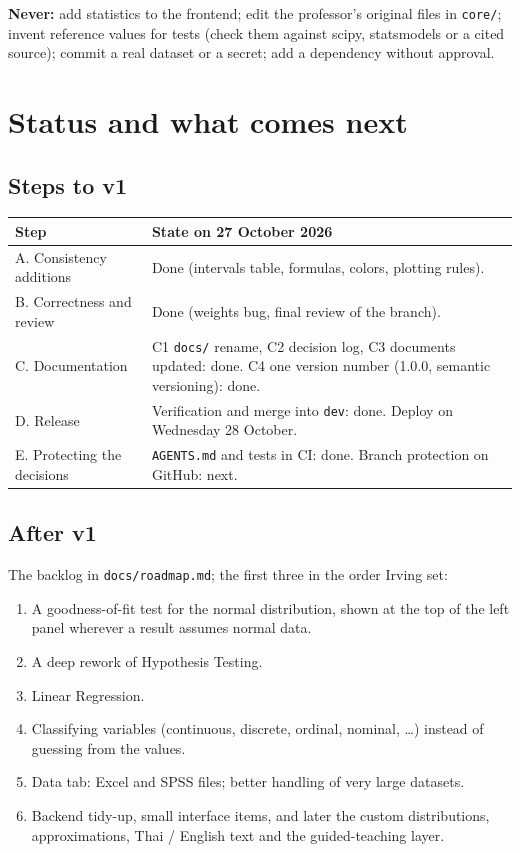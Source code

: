 \documentclass[11pt,a4paper]{article}
\newcommand{\f}[1]{\texttt{#1}}
\begin{document}
\begin{note}
\textbf{Never:} add statistics to the frontend; edit the professor's original files in \f{core/}; invent
reference values for tests (check them against scipy, statsmodels or a cited source); commit a real dataset or
a secret; add a dependency without approval.
\end{note}

\section{Status and what comes next}

\subsection{Steps to v1}
\begin{tabularx}{\textwidth}{@{}lL@{}}
\toprule
\textbf{Step} & \textbf{State on 27 October 2026} \\
\midrule
A. Consistency additions & Done (intervals table, formulas, colors, plotting rules). \\
B. Correctness and review & Done (weights bug, final review of the branch). \\
C. Documentation & C1 \f{docs/} rename, C2 decision log, C3 documents updated: done. C4 one version number (1.0.0, semantic versioning): done. \\
D. Release & Verification and merge into \f{dev}: done. Deploy on Wednesday 28 October. \\
E. Protecting the decisions & \f{AGENTS.md} and tests in CI: done. Branch protection on GitHub: next. \\
\bottomrule
\end{tabularx}

\subsection{After v1}
The backlog in \f{docs/roadmap.md}; the first three in the order Irving set:
\begin{enumerate}
\item A goodness-of-fit test for the normal distribution, shown at the top of the left panel wherever a result
  assumes normal data.
\item A deep rework of Hypothesis Testing.
\item Linear Regression.
\item Classifying variables (continuous, discrete, ordinal, nominal, …) instead of guessing from the values.
\item Data tab: Excel and SPSS files; better handling of very large datasets.
\item Backend tidy-up, small interface items, and later the custom distributions, approximations, Thai /
  English text and the guided-teaching layer.
\end{enumerate}
\end{document}
